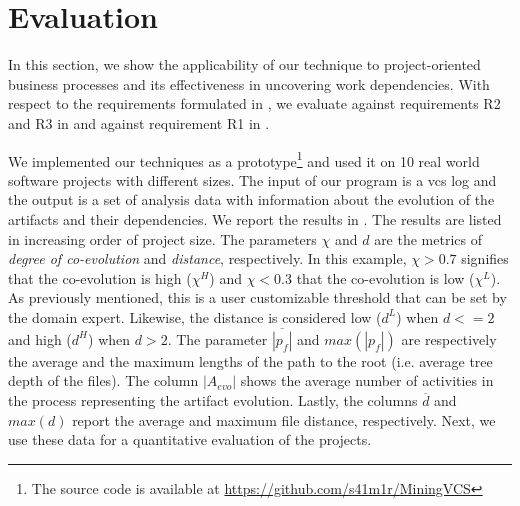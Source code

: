 \section{Evaluation}
\label{sec:bpm2017evaluation}

In this section, we show the applicability of our technique to project-oriented business processes and its effectiveness in uncovering work dependencies. With respect to the requirements formulated in , we evaluate against requirements {R2} and {R3} in  and against requirement {R1} in .

We implemented our techniques as a prototype\footnote{The source code is available at \url{https://github.com/s41m1r/MiningVCS}} and used it on 10 real world software projects with different sizes. The input of our program is a \gls{vcs} log and the output is a set of analysis data with information about the evolution of the artifacts and their dependencies. We report the results in . The results are listed in increasing order of project size. The parameters $\chi$ and $d$ are the metrics of \emph{degree of co-evolution} and \emph{distance}, respectively. In this example, $\chi > 0.7$ signifies that the co-evolution is high ($\chi^{H}$) and $\chi < 0.3$ that the co-evolution is low ($\chi^{L}$). As previously mentioned, this is a user customizable threshold that can be set by the domain expert. Likewise, the distance is considered low ($d^{L}$) when $d<=2$ and high ($d^{H}$) when $d>2$. The parameter  $\overline{|p_f|}$ and {$max(|p_{f}|)$} are respectively the average and the maximum lengths of the path to the root (i.e. average tree depth of the files). The column {$|A_{evo}|$} shows the average number of activities in the process representing the artifact evolution. Lastly, the columns {$\overline{d}$} and {$max(d)$} report the average and maximum file distance, respectively. Next, we use these data for a quantitative evaluation of the projects.



%




%

